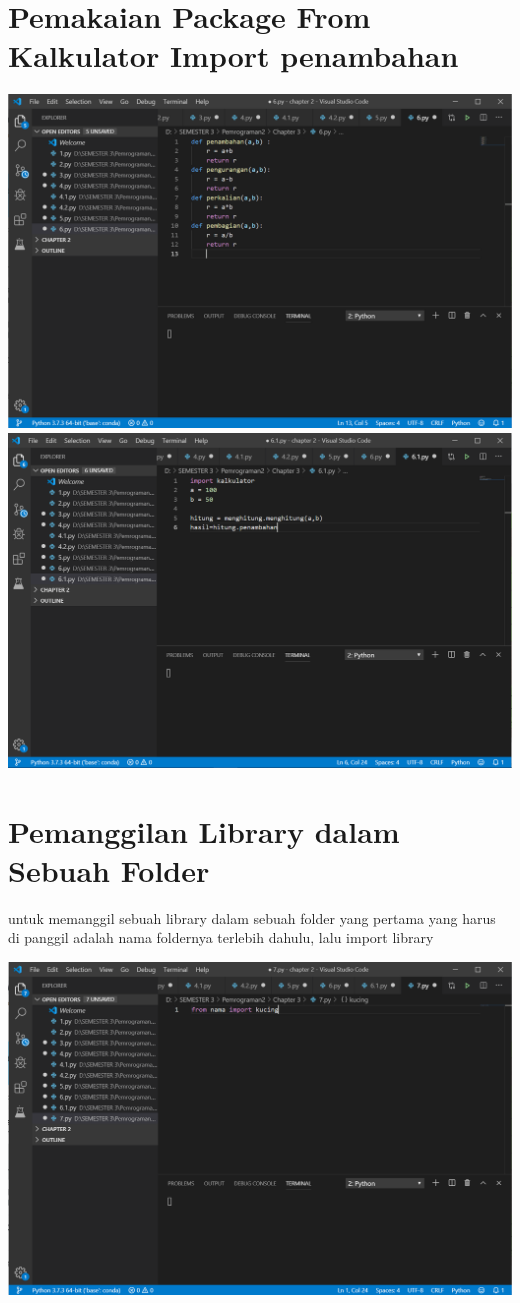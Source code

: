 \documentclass{article}
\begin{document}
\section{Pemakaian Package From Kalkulator Import penambahan}
\begin{center}
    \includegraphics[width=.8\textwidth]{keterampilan/6.PNG}
    \includegraphics[width=.8\textwidth]{keterampilan/6.1.PNG}
\end{center}

\section{Pemanggilan Library dalam Sebuah Folder}
untuk memanggil sebuah library dalam sebuah folder yang pertama yang harus di panggil adalah nama foldernya terlebih dahulu, lalu import library
\begin{center}
    \includegraphics[width=.8\textwidth]{keterampilan/7.PNG}
\end{center}
\end{document}
